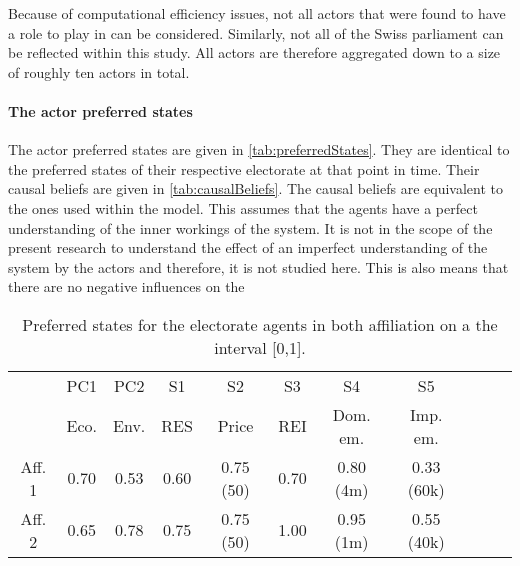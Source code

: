 Because of computational efficiency issues, not all actors that were found to have a role to play in \cite{markard2016socio} can be considered. Similarly, not all of the Swiss parliament can be reflected within this study. All actors are therefore aggregated down to a size of roughly ten actors in total. 

\paragraph{The actor preferred states} The actor preferred states are given in \autoref{tab:preferredStates}. They are identical to the preferred states of their respective electorate at that point in time. Their causal beliefs are given in \autoref{tab:causalBeliefs}. The causal beliefs are equivalent to the ones used within the model. This assumes that the agents have a perfect understanding of the inner workings of the system. It is not in the scope of the present research to understand the effect of an imperfect understanding of the system by the actors and therefore, it is not studied here. This is also means that there are no negative influences on the 

\begin{table}
\begin{center}
\begin{tabular}{ |c|c|c|c|c|c|c|c|c|c|c| } 
\hline
		
		& PC1 	& PC2	& S1		& S2			& S3		& S4			& S5		\\ 
		& Eco.	& Env.	& RES	& Price		& REI	& Dom. em.	& Imp. em.	\\ \hline \hline
Aff. 1		& 0.70	& 0.53	& 0.60	& 0.75 (50)	& 0.70	& 0.80 (4m)	& 0.33 (60k)	\\ \hline
Aff. 2		& 0.65	& 0.78	& 0.75	& 0.75 (50) 	& 1.00	& 0.95 (1m)	& 0.55 (40k)	\\ 
\hline
\end{tabular}
\end{center}
\caption{Preferred states for the electorate agents in both affiliation on a the interval [0,1].}
\label{tab:preferredStates}
\end{table}


